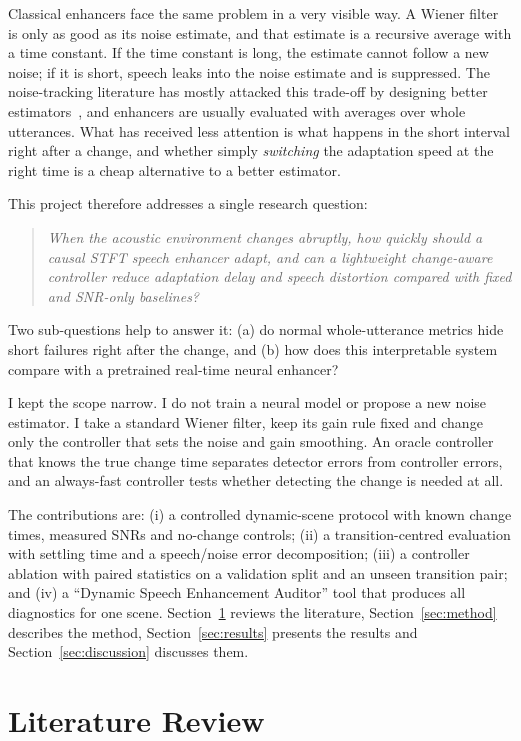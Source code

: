 \documentclass[10pt,conference,a4paper]{IEEEtran}
\begin{document}
Classical enhancers face the same problem in a very visible way. A Wiener
filter is only as good as its noise estimate, and that estimate is a recursive
average with a time constant. If the time constant is long, the estimate cannot
follow a new noise; if it is short, speech leaks into the noise estimate and is
suppressed. The noise-tracking literature has mostly attacked this trade-off by
designing better estimators~\cite{martin2001noise,gerkmann2012unbiased}, and
enhancers are usually evaluated with averages over whole utterances. What has
received less attention is what happens in the short interval right after a
change, and whether simply \emph{switching} the adaptation speed at the right
time is a cheap alternative to a better estimator.

This project therefore addresses a single research question:
\begin{quote}
\emph{When the acoustic environment changes abruptly, how quickly should a
causal STFT speech enhancer adapt, and can a lightweight change-aware controller
reduce adaptation delay and speech distortion compared with fixed and SNR-only
baselines?}
\end{quote}
Two sub-questions help to answer it: (a) do normal whole-utterance metrics hide
short failures right after the change, and (b) how does this interpretable
system compare with a pretrained real-time neural enhancer?

I kept the scope narrow. I do not train a neural model or propose a
new noise estimator. I take a standard Wiener filter, keep its gain rule fixed
and change only the controller that sets the noise and gain smoothing. An
oracle controller that knows the true change time separates detector errors from
controller errors, and an always-fast controller tests whether detecting the
change is needed at all.

The contributions are: (i) a controlled dynamic-scene protocol with known
change times, measured SNRs and no-change controls; (ii) a transition-centred
evaluation with settling time and a speech/noise error decomposition; (iii) a
controller ablation with paired statistics on a validation split and an unseen
transition pair; and (iv) a ``Dynamic
Speech Enhancement Auditor'' tool that produces all diagnostics for one scene.
Section~\ref{sec:lit} reviews the literature, Section~\ref{sec:method}
describes the method, Section~\ref{sec:results} presents the results and
Section~\ref{sec:discussion} discusses them.

\section{Literature Review}
\label{sec:lit}
\end{document}

